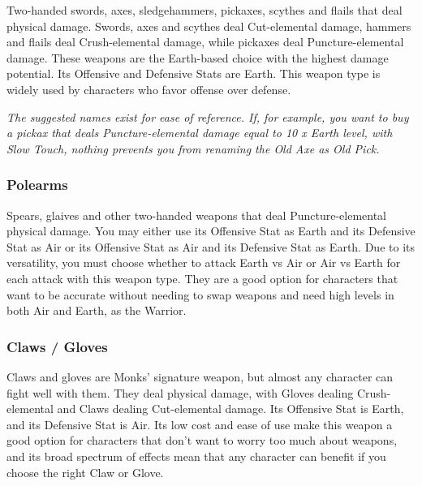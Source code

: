 Two-handed swords, axes, sledgehammers, pickaxes, scythes and flails that deal physical damage. Swords, axes and scythes deal Cut-elemental damage, hammers and flails deal Crush-elemental damage, while pickaxes deal Puncture-elemental damage. These weapons are the Earth-based choice with the highest damage potential. Its Offensive and Defensive Stats are Earth. This weapon type is widely used by characters who favor offense over defense.

\begin{tabwpn}[label=inv-hwpn,range=melee,type=physical,element=crush / cut / puncture,roll=earthvearth]
    
\end{tabwpn}
{\footnotesize\textit{The suggested names exist for ease of reference. If, for example, you want to buy a pickax that deals Puncture-elemental damage equal to 10 x Earth level, with Slow Touch, nothing prevents you from renaming the Old Axe as Old Pick.}}
\clearpage

\subsubsection{Polearms}

Spears, glaives and other two-handed weapons that deal Puncture-elemental physical damage. You may either use its Offensive Stat as Earth and its Defensive Stat as Air or its Offensive Stat as Air and its Defensive Stat as Earth. Due to its versatility, you must choose whether to attack Earth vs Air or Air vs Earth for each attack with this weapon type. They are a good option for characters that want to be accurate without needing to swap weapons and need high levels in both Air and Earth, as the Warrior. 

\begin{tabwpn}[label=inv-pole,range=melee,type=physical,element=puncture,roll=earthvair / airvearth]
    
\end{tabwpn}
\clearpage

\subsubsection{Claws / Gloves}

Claws and gloves are Monks’ signature weapon, but almost any character can fight well with them. They deal physical damage, with Gloves dealing Crush-elemental and Claws dealing Cut-elemental damage. Its Offensive Stat is Earth, and its Defensive Stat is Air. Its low cost and ease of use make this weapon a good option for characters that don’t want to worry too much about weapons, and its broad spectrum of effects mean that any character can benefit if you choose the right Claw or Glove. 

